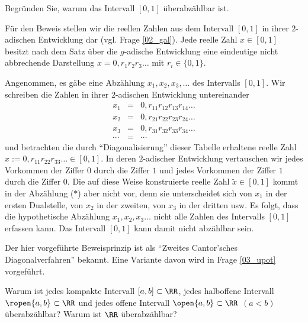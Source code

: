 \begin{frage}\label{03_uint}
  Begründen Sie, warum das Intervall $[0,1]$ überabzählbar ist.
\end{frage}

\begin{antwort}
  Für den Beweis stellen wir die reellen Zahlen 
  aus dem Intervall $[0,1]$ in ihrer $2$-adischen Entwicklung dar (vgl. 
  Frage \ref{02_gal}). Jede reelle Zahl $x\in [0,1]$ besitzt nach 
  dem Satz über die $g$-adische Entwicklung eine eindeutige nicht abbrechende 
  Darstellung $x=0,r_1r_2r_3\ldots$ mit $r_i\in\{0,1\}$.  

  Angenommen, es gäbe eine Abzählung $x_1,x_2,x_3,\ldots$ des Intervalls 
  $[0,1]$. Wir schreiben die Zahlen in ihrer $2$-adischen Entwicklung 
  untereinander
  \begin{equation}
    \begin{array}{rcl}
      x_1 &=& 0,r_{11}r_{12}r_{13}r_{14}\ldots \\
      x_2 &=& 0,r_{21}r_{22}r_{23}r_{24}\ldots \\
      x_3 &=& 0,r_{31}r_{32}r_{33}r_{34}\ldots \\
      \cdots &=& \cdots 
    \end{array}\tag{$\ast$}
  \end{equation}
  und betrachten die durch "`Diagonalisierung"' dieser 
   Tabelle erhaltene reelle Zahl 
  $x:=0,r_{11}r_{22}r_{33}\ldots \in[0,1]$.
  In deren $2$-adischer Entwicklung vertauschen wir jedes Vorkommen 
  der Ziffer $0$ durch die Ziffer $1$ und jedes Vorkommen 
  der Ziffer $1$ durch die Ziffer $0$. 
  Die auf diese Weise konstruierte reelle Zahl 
  $\widetilde{x}\in[0,1]$ kommt in der Abzählung ($\ast$) 
  aber nicht vor, denn sie unterscheidet sich von $x_1$ in der ersten 
  Dualstelle, von $x_2$ in der zweiten, von $x_3$ in der dritten usw. 
  Es folgt, dass die  hypothetische Abzählung 
  $x_1,x_2,x_3\ldots$ nicht alle Zahlen des 
  Intervalls $[0,1]$ erfassen kann. Das Intervall $[0,1]$ kann  
  damit nicht abzählbar sein. 

  Der hier vorgeführte Beweisprinzip ist 
  als "`Zweites Cantor'sches Diagonalverfahren"' bekannt. Eine Variante 
  davon wird in Frage \ref{03_upot} vorgeführt.
  \AntEnd  
\end{antwort}

\begin{frage}\label{03_ueb}
  Warum ist jedes kompakte Intervall $[a,b]\subset \RR$, 
  jedes halboffene Intervall $\ropen{a,b}\subset \RR$ und jedes 
  offene Intervall $\open{a,b}\subset \RR$ 
  $(a<b)$ überabzählbar? Warum ist $\RR$ überabzählbar? 
\end{frage}

